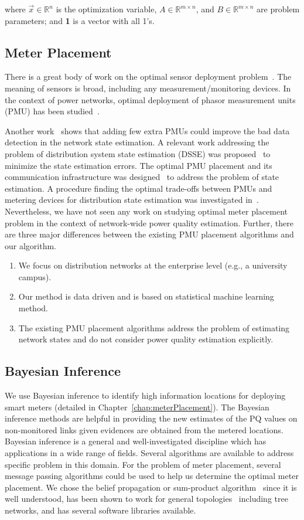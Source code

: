 where $\vec{x}\in \mathbb{R}^n$ is the optimization variable, $A \in \mathbb{R}^{m \times n}$, and $B \in \mathbb{R}^{m \times n}$ are problem parameters;  and \textbf{1} is a vector with all 1's.

\subsection{Meter Placement}
There is a great body of work on the optimal sensor deployment problem~\cite{Krause09}. The meaning of sensors is broad, including any measurement/monitoring devices. In the context of power networks, optimal deployment of phasor measurement units (PMU) has been studied~\cite{Yuill11}. 


Another work~\cite{chen2006placement} shows that adding few extra PMUs could improve the bad data detection in the network state estimation. A relevant work addressing the problem of distribution system state estimation (DSSE) was proposed~\cite{singh2011meter} to minimize the state estimation errors. The optimal PMU placement and its communication infrastructure was designed~\cite{shahraeini2012co} to address the problem of state estimation. A procedure finding the optimal trade-offs between PMUs and metering devices for distribution state estimation was investigated in~\cite{liu2012trade}. Nevertheless, we have not seen any work on studying optimal meter placement problem in the context of network-wide power quality estimation. Further, there are three major differences between the existing PMU placement algorithms and our algorithm.
\begin{enumerate}
\item We focus on distribution networks at the enterprise level (e.g., a university campus).
\item Our method is data driven and is based on statistical machine learning method.
\item The existing PMU placement algorithms address the problem of estimating network states and do not consider power quality estimation explicitly.
\end{enumerate}

\subsection{Bayesian Inference}
We use Bayesian inference to identify high information locations for deploying smart meters (detailed in Chapter~\ref{chap:meterPlacement}). The Bayesian inference methods are helpful in providing the new estimates of the PQ values on non-monitored links given evidences are obtained from the metered locations. Bayesian inference is a general and well-investigated discipline which has applications in a wide range of fields. Several algorithms are available to address specific problem in this domain. For the problem of meter placement, several message passing algorithms could be used to
help us determine the optimal meter placement. We chose the belief propagation or sum-product algorithm~\cite{pearl1988probabilistic} since it is well understood, has been shown to work for general topologies~\cite{yedidia2001generalized} including tree networks, and has several software libraries available.

